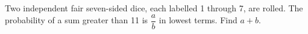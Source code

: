 Two independent fair seven-sided dice, each labelled 1 through 7, are rolled. The probability of a sum greater than 11 is $\dfrac{a}{b}$ in lowest terms. Find $a+b$.
